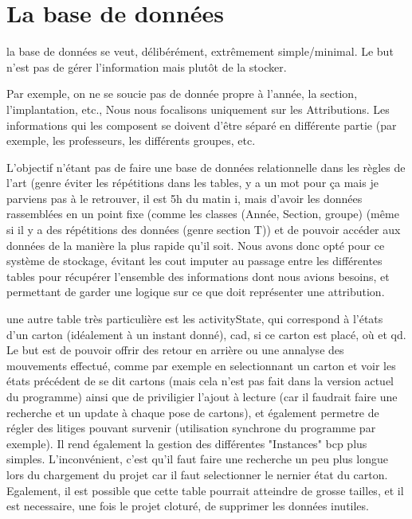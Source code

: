 \chapter{La base de données}
la base de données se veut, délibérément, extrêmement simple/minimal.  Le but n'est pas de gérer l'information mais plutôt de la stocker.

Par exemple, on ne se soucie pas de donnée propre à l'année, la section, l'implantation, etc.,  Nous nous focalisons uniquement sur les Attributions. Les informations qui les composent se doivent d'être séparé en différente partie (par exemple, les professeurs, les différents groupes, etc.

L'objectif n'étant pas de faire une base de données relationnelle dans les règles de l'art (genre éviter les répétitions dans les tables, y a un mot pour ça mais je parviens pas à le retrouver, il est 5h du matin ^^), mais d'avoir les données rassemblées en un point fixe (comme les classes (Année, Section, groupe) (même si il y a des répétitions des données (genre section T)) et de pouvoir accéder aux données de la manière la plus rapide qu'il soit. Nous avons donc opté pour ce système de stockage, évitant les cout imputer au passage entre les différentes tables pour récupérer l'ensemble des informations dont nous avions besoins, et permettant de garder une logique sur ce que doit représenter une attribution.

une autre table très particulière est les activityState, qui correspond à l'états d'un carton (idéalement à un instant donné), cad, si ce carton est placé, où et qd.  Le but est de pouvoir offrir des retour en arrière ou une annalyse des mouvements effectué, comme par exemple en selectionnant un carton et voir les états précédent de se dit cartons (mais cela n'est pas fait dans la version actuel du programme) ainsi que de priviligier l'ajout à lecture (car il faudrait faire une recherche et un update à chaque pose de cartons), et également permetre de régler des litiges pouvant survenir (utilisation synchrone du programme par exemple).  Il rend également la gestion des différentes "Instances" bcp plus simples.  L'inconvénient, c'est qu'il faut faire une recherche un peu plus longue lors du chargement du projet car il faut selectionner le nernier état du carton. Egalement, il est possible que cette table pourrait atteindre de grosse tailles, et il est necessaire, une fois le projet cloturé, de supprimer les données inutiles. 

